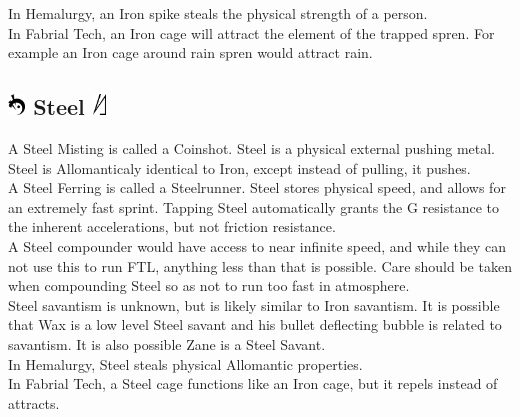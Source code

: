 \documentclass[conference]{IEEEtran}
\begin{document}
In Hemalurgy, an Iron spike steals the physical strength of a person.\\  

In Fabrial Tech, an Iron cage will attract the element of the trapped spren.  For example an Iron cage around rain spren would attract rain.

\subsection*{\includegraphics[height=1em]{images/Steel.png}  Steel \includegraphics[height=1em]{images/Steel_(Feruchemy).png}}
A Steel Misting is called a Coinshot.  Steel is a physical external pushing metal.  Steel is Allomanticaly identical to Iron, except instead of pulling, it pushes.\\

A Steel Ferring is called a Steelrunner.  Steel stores physical speed, and allows for an extremely fast sprint.  Tapping Steel automatically grants the G resistance to the inherent accelerations, but not friction resistance.\\

A Steel compounder would have access to near infinite speed, and while they can not use this to run FTL, anything less than that is possible.  Care should be taken when compounding Steel so as not to run too fast in atmosphere.\\

Steel savantism is unknown, but is likely similar to Iron savantism.  It is possible that Wax is a low level Steel savant and his bullet deflecting bubble is related to savantism.
It is also possible Zane is a Steel Savant.\\

In Hemalurgy, Steel steals physical Allomantic properties.  \\

In Fabrial Tech, a Steel cage functions like an Iron cage, but it repels instead of attracts.
\end{document}
